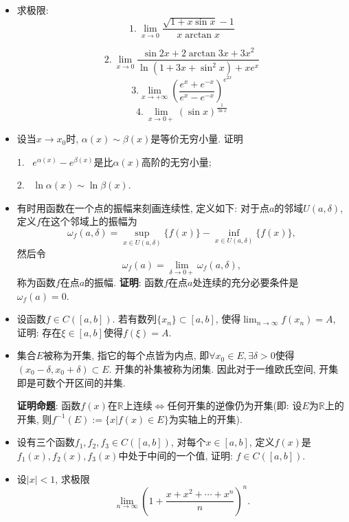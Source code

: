 \documentclass[UTF8,11pt, a4paper, oneside, fontset=none]{ctexbook}
\begin{document}
\begin{itemize}

\item[(1)] 求极限: 
\[
1. \ \lim_{x \to 0} \frac{\sqrt{1 + x \sin x} -1}{x \arctan x}
\]

\[
2. \ \lim_{x \to 0} \frac{\sin 2x + 2 \arctan 3x + 3x^2}{\ln(1 + 3x + \sin^2 x) + xe^x} 
\]
\[
3. \lim_{x \to +\infty} \left( \frac{e^x + e^{-x}}{e^x - e^{-x}}\right)^{e^{2x}} 
\]
\[
4. \ \lim_{x \to 0+}(\sin x)^{\frac{1}{\ln x}}
\]

\item[(2)] 设当$x \to x_0$时, $\alpha(x) \sim \beta(x)$是等价无穷小量. 证明

1. \ $e^{\alpha(x)} - e^{\beta(x)}$是比$\alpha(x)$高阶的无穷小量;

2. \ $\ln \alpha(x) \sim \ln \beta(x) $.

\item[(3)] 有时用函数在一个点的振幅来刻画连续性, 定义如下: 对于点$a$的邻域$U(a, \delta)$, 定义$f$在这个邻域上的振幅为
\[
\omega_f(a, \delta) = \sup_{x \in U(a, \delta)}\{ f(x)\} - \inf_{x \in U(a, \delta)}\{ f(x)\},
\]
然后令
\[
\omega_f(a) = \lim_{\delta \to 0+} \omega_f(a, \delta),
\]
称为函数$f$在点$a$的振幅. {\bf 证明}: 函数$f$在点$a$处连续的充分必要条件是$\omega_f(a) =0$.

\item[(4)] 设函数$f \in C([a, b])$. 若有数列$\{x_n\} \subset [a, b]$, 使得$\lim_{n \to \infty}f(x_n)=A$, 证明: 存在$\xi \in [a, b]$使得$f(\xi) = A$.

\item[(5)] 集合$E$被称为开集, 指它的每个点皆为内点, 即$\forall x_0 \in E, \exists \delta >0$使得$(x_0 - \delta, x_0 + \delta ) \subset E$. 开集的补集被称为闭集. 因此对于一维欧氏空间, 开集即是可数个开区间的并集.

{\bf 证明命题}: 函数$f(x)$在$\mathbb R$上连续$\Leftrightarrow$任何开集的逆像仍为开集(即: 设$E$为$\mathbb R$上的开集, 则$f^{-1}(E) := \{ x | f(x) \in E \}$为实轴上的开集).

\item[(6)] 
设有三个函数$f_1, f_2, f_3 \in C([a, b])$, 对每个$x \in [a, b]$, 定义$f(x)$是$f_1(x), f_2(x), f_3(x)$中处于中间的一个值, 证明: $f \in C([a, b])$.

\item[(7)] 设$|x| <1$, 求极限
\[
\lim_{n \to \infty} \left( 1+ \frac{x + x^2 + \cdots +x^n}{n} \right)^n.
\]

\end{itemize}
\end{document}
